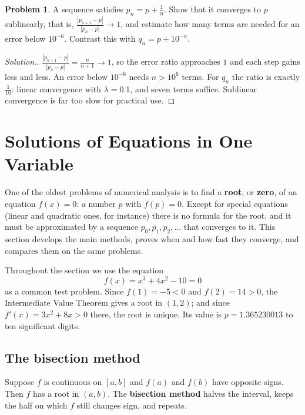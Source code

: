 \documentclass[11pt,a4paper]{article}
\numberwithin{equation}{section}
\theoremstyle{definition}
\newtheorem{problemx}{Problem}[subsection]
\newenvironment{problem}{\begin{problemx}}{\end{problemx}}
\newenvironment{solution}
  {\renewcommand{\qedsymbol}{}\begin{proof}[\textit{Solution}.]}
  {\end{proof}}
\begin{document}
\begin{problem}
A sequence satisfies $p_n = p+\frac{1}{n}$. Show that it converges to $p$ sublinearly, that is, $\frac{|p_{n+1}-p|}{|p_n-p|}\longrightarrow
1$, and estimate how many terms are needed for an error below $10^{-6}$. Contrast this with $q_n = p+10^{-n}$.
\end{problem}
\begin{solution}
$\frac{|p_{n+1}-p|}{|p_n-p|} = \frac{n}{n+1}\longrightarrow1$, so the error ratio approaches $1$ and each step gains less and less. An error
below $10^{-6}$ needs $n>10^6$ terms. For $q_n$ the ratio is exactly $\frac{1}{10}$: linear convergence with $\lambda = 0.1$, and seven
terms suffice. Sublinear convergence is far too slow for practical use.
\end{solution}

\section{Solutions of Equations in One Variable}
\label{sec:roots}

One of the oldest problems of numerical analysis is to find a \textbf{root}, or \textbf{zero}, of an equation $f(x) = 0$: a number $p$
with $f(p) = 0$. Except for special equations (linear and quadratic ones, for instance) there is no formula for the root, and it must
be approximated by a sequence $p_0, p_1, p_2,\dots$ that converges to it. This section develops the main methods, proves when and how
fast they converge, and compares them on the same problems.

Throughout the section we use the equation
\begin{equation}\label{eq:test}
f(x) = x^3+4x^2-10 = 0
\end{equation}
as a common test problem. Since $f(1) = -5<0$ and $f(2) = 14>0$, the Intermediate Value Theorem gives a root in $(1,2)$; and since
$f'(x) = 3x^2+8x>0$ there, the root is unique. Its value is $p = 1.365230013$ to ten significant digits.


\subsection{The bisection method}
\label{sec:bisection}

Suppose $f$ is continuous on $[a,b]$ and $f(a)$ and $f(b)$ have opposite signs. Then $f$ has a root in $(a,b)$. The \textbf{bisection
method} halves the interval, keeps the half on which $f$ still changes sign, and repeats.
\end{document}
